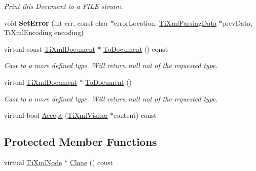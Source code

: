 \begin{DoxyCompactItemize}
\begin{DoxyCompactList}\small\item\em \-Print this \-Document to a \-F\-I\-L\-E stream. \end{DoxyCompactList}\item 
\hypertarget{class_ti_xml_document_a735c23e318597b920c94eae77fa206de}{void {\bfseries \-Set\-Error} (int err, const char $\ast$error\-Location, \hyperlink{class_ti_xml_parsing_data}{\-Ti\-Xml\-Parsing\-Data} $\ast$prev\-Data, \-Ti\-Xml\-Encoding encoding)}\label{class_ti_xml_document_a735c23e318597b920c94eae77fa206de}

\item 
\hypertarget{class_ti_xml_document_a1dc977bde3e4fe85a8eb9d88a35ef5a4}{virtual const \hyperlink{class_ti_xml_document}{\-Ti\-Xml\-Document} $\ast$ \hyperlink{class_ti_xml_document_a1dc977bde3e4fe85a8eb9d88a35ef5a4}{\-To\-Document} () const }\label{class_ti_xml_document_a1dc977bde3e4fe85a8eb9d88a35ef5a4}

\begin{DoxyCompactList}\small\item\em \-Cast to a more defined type. \-Will return null not of the requested type. \end{DoxyCompactList}\item 
\hypertarget{class_ti_xml_document_a1025d942a1f328fd742d545e37efdd42}{virtual \hyperlink{class_ti_xml_document}{\-Ti\-Xml\-Document} $\ast$ \hyperlink{class_ti_xml_document_a1025d942a1f328fd742d545e37efdd42}{\-To\-Document} ()}\label{class_ti_xml_document_a1025d942a1f328fd742d545e37efdd42}

\begin{DoxyCompactList}\small\item\em \-Cast to a more defined type. \-Will return null not of the requested type. \end{DoxyCompactList}\item 
virtual bool \hyperlink{class_ti_xml_document_a3daab2f472418ef66315750202f762ae}{\-Accept} (\hyperlink{class_ti_xml_visitor}{\-Ti\-Xml\-Visitor} $\ast$content) const 
\end{DoxyCompactItemize}
\subsection*{\-Protected \-Member \-Functions}
\begin{DoxyCompactItemize}
\item 
virtual \hyperlink{class_ti_xml_node}{\-Ti\-Xml\-Node} $\ast$ \hyperlink{class_ti_xml_document_ac9e8f09b23454d953b32d1b65cd1409e}{\-Clone} () const 
\end{DoxyCompactItemize}


